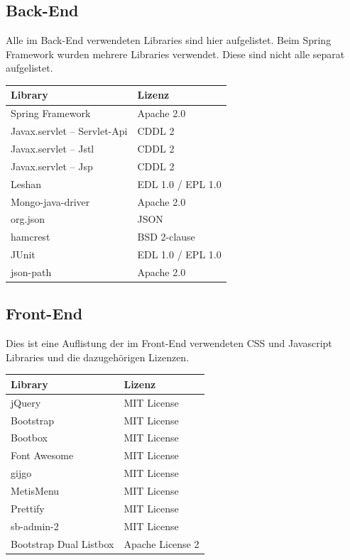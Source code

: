 \subsection{Back-End}
Alle im Back-End verwendeten Libraries sind hier aufgelistet. Beim Spring Framework wurden mehrere Libraries verwendet. Diese sind nicht alle separat aufgelistet. 
\begin{table}[H]
\begin{tabular}{|l|l|}
\hline 
\textbf{Library} & \textbf{Lizenz} \\ 
\hline 
Spring Framework
 & Apache 2.0
 \\ 
\hline 
Javax.servlet – Servlet-Api
 & CDDL 2 \\ 
\hline 
Javax.servlet – Jstl & CDDL 2 \\ 
\hline 
Javax.servlet – Jsp & CDDL 2 \\ 
\hline 
Leshan & EDL 1.0 / EPL 1.0 \\ 
\hline 
Mongo-java-driver & Apache 2.0 \\ 
\hline 
org.json & JSON \\ 
\hline 
hamcrest & BSD 2-clause \\ 
\hline 
JUnit & EDL 1.0 / EPL 1.0 \\ 
\hline 
json-path & Apache 2.0 \\  \hline
\end{tabular} 
\end{table}

\subsection{Front-End}
Dies ist eine Auflistung der im Front-End verwendeten CSS und Javascript Libraries und die dazugehörigen Lizenzen. 
\begin{table}[H]
\begin{tabular}{|l|l|}
\hline 
\textbf{Library} & \textbf{Lizenz} \\ 
\hline 
jQuery	&	MIT License	 \\ \hline
Bootstrap	&	MIT License	 \\ \hline
Bootbox	&	MIT License	 \\ \hline
Font Awesome	&	MIT License	 \\ \hline
gijgo	&	MIT License	 \\ \hline
MetisMenu	&	MIT License	 \\ \hline
Prettify	&	MIT License	 \\ \hline
sb-admin-2	&	MIT License	 \\ \hline
Bootstrap Dual Listbox	&	Apache License 2	 \\ \hline
\end{tabular} 
\end{table}

